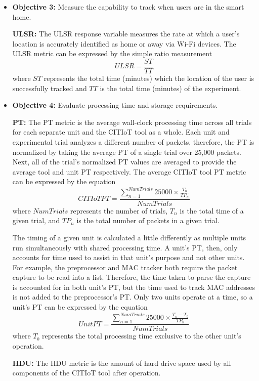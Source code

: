 \documentclass[12pt,letterpaper,oneside]{book}
\begin{document}
\begin{itemize}
			\item \textbf{Objective 3:} Measure the capability to track when users are in the smart home.
			
			\hspace{4ex}\textbf{\ac{ULSR}:} The \ac{ULSR} response variable measures the rate at which a user's location is accurately identified as home or away via Wi-Fi devices. The \ac{ULSR} metric can be expressed by the simple ratio measurement
			\begin{equation}
			ULSR = \frac{ST}{TT}
			\end{equation}
			where $ST$ represents the total time (minutes) which the location of the user is successfully tracked and $TT$ is the total time (minutes) of the experiment.
			
			\item \textbf{Objective 4:} Evaluate processing time and storage requirements.
			
			\hspace{4ex}\textbf{\ac{PT}:} The \ac{PT} metric is the average wall-clock processing time across all trials for each separate unit and the \ac{CITIoT} tool as a whole. Each unit and experimental trial analyzes a different number of packets, therefore, the \ac{PT} is normalized by taking the average \ac{PT} of a single trial over 25,000 packets. Next, all of the trial's normalized \ac{PT} values are averaged to provide the average tool and unit \ac{PT} respectively. The average \ac{CITIoT} tool \ac{PT} metric can be expressed by the equation
			\begin{equation}
			CITIoT PT =\frac{\sum_{n=1}^{NumTrials} 25000\times\frac{T_n}{TP_n}} {NumTrials}
			\end{equation}
			where $NumTrials$ represents the number of trials, $T_n$ is the total time of a given trial, and $TP_n$ is the total number of packets in a given trial.
			
			The timing of a given unit is calculated a little differently as multiple units run simultaneously with shared processing time. A unit's \ac{PT}, then, only accounts for time used to assist in that unit's purpose and not other units. For example, the preprocessor and \ac{MAC} tracker both require the packet capture to be read into a list. Therefore, the time taken to parse the capture is accounted for in both unit's \ac{PT}, but the time used to track \ac{MAC} addresses is not added to the preprocessor's \ac{PT}. Only two units operate at a time, so a unit's \ac{PT} can be expressed by the equation
			\begin{equation}
			UnitPT=\frac{\sum_{n=1}^{NumTrials} 25000\times\frac{T_n-T_b}{TP_n}}{NumTrials}
			\end{equation}
			where $T_b$ represents the total processing time exclusive to the other unit's operation.
			
			\hspace{4ex}\textbf{\ac{HDU}:} The \ac{HDU} metric is the amount of hard drive space used by all components of the \ac{CITIoT} tool after operation.
			
		\end{itemize}
	
\end{document}
